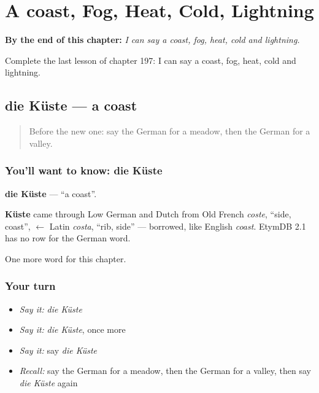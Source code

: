 
\chapter{A coast, Fog, Heat, Cold, Lightning}
\label{ch:ge-a-coast-fog-heat-cold-lightning}

\begin{chapteropening}
\textbf{By the end of this chapter:} \emph{I can say a coast, fog, heat, cold and lightning.}

Complete the last lesson of chapter 197: I can say a coast, fog, heat, cold and lightning.
\end{chapteropening}

\section[die Küste]{die Küste — a coast}

\label{lesson:GE-C197-kueste}



\begin{quote}
Before the new one: say the German for a meadow, then the German for a valley.
\end{quote}

\subsection*{You'll want to know: die Küste}
\textbf{die Küste} — \textquotedblleft{}a coast\textquotedblright{}.

\begin{cousinweb}
\textbf{Küste} came through Low German and Dutch from Old French \emph{coste}, \textquotedblleft{}side, coast\textquotedblright{}, $\leftarrow$ Latin \emph{costa}, \textquotedblleft{}rib, side\textquotedblright{} — borrowed, like English \emph{coast}. EtymDB 2.1 has no row for the German word.
\end{cousinweb}

\begin{grammarlens}[title={What you've built}]
One more word for this chapter.
\end{grammarlens}

\subsection*{Your turn}
\begin{itemize}
\raggedright
  \item \emph{Say it:} \emph{die Küste}
  \item \emph{Say it:} \emph{die Küste}, once more
  \item \emph{Say it:} say \emph{die Küste}
  \item \emph{Recall:} say the German for a meadow, then the German for a valley, then say \emph{die Küste} again
\end{itemize}

